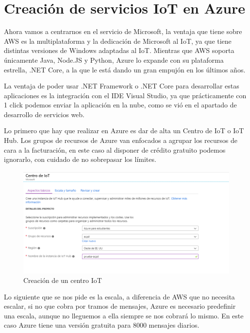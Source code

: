 \section{Creación de servicios IoT en Azure}
Ahora vamos a centrarnos en el servicio de Microsoft, la ventaja que tiene sobre AWS es la multiplataforma y la dedicación de Microsoft al IoT, ya que tiene distintas versiones de Windows adaptadas al IoT. Mientras que AWS soporta únicamente Java, Node.JS y Python, Azure lo expande con su plataforma estrella, .NET Core, a la que le está dando un gran empujón en los últimos años.

La ventaja de poder usar .NET Framework o .NET Core para desarrollar estas aplicaciones es la integración con el IDE Visual Studio, ya que prácticamente con 1 click podemos enviar la aplicación en la nube, como se vió en el apartado de desarrollo de servicios web.

Lo primero que hay que realizar en Azure es dar de alta un Centro de IoT o IoT Hub. Los grupos de recursos de Azure van enfocados a agrupar los recursos de cara a la facturación, en este caso al disponer de crédito gratuito podemos ignorarlo, con cuidado de no sobrepasar los límites.

\begin{figure}[h]
	\centering
	\includegraphics[scale=0.5]{iot_azure/primera.png}
	\caption{Creación de un centro IoT}
	\label{AZIOT1}
\end{figure}

Lo siguiente que se nos pide es la escala, a diferencia de AWS que no necesita escalar, si no que cobra por tramos de mensajes, Azure es necesario predefinir una escala, aunque no lleguemos a ella siempre se nos cobrará lo mismo. En este caso Azure tiene una versión gratuita para 8000 mensajes diarios.

